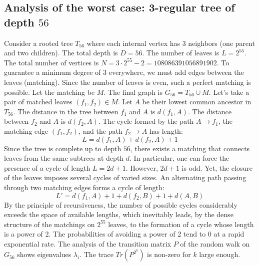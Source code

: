 \documentclass[12pt,a4paper]{article}
\begin{document}
\subsection{Analysis of the worst case: 3-regular tree of depth $56$}
Consider a rooted tree $T_{56}$ where each internal vertex has 3 neighbors (one parent and two children).
The total depth is $D = 56$.
The number of leaves is $L = 2^{55}$.
The total number of vertices is $N = 3 \cdot 2^{55} - 2 = 108086391056891902$.
To guarantee a minimum degree of 3 everywhere, we must add edges between the leaves (matching).
Since the number of leaves is even, such a perfect matching is possible.
Let the matching be $M$. The final graph is $G_{56} = T_{56} \cup M$.
Let's take a pair of matched leaves $(f_1, f_2) \in M$.
Let $A$ be their lowest common ancestor in $T_{56}$.
The distance in the tree between $f_1$ and $A$ is $d(f_1, A)$.
The distance between $f_2$ and $A$ is $d(f_2, A)$.
The cycle formed by the path $A \to f_1$, the matching edge $(f_1, f_2)$, and the path $f_2 \to A$ has length:
$$ L = d(f_1, A) + d(f_2, A) + 1 $$
Since the tree is complete up to depth $56$, there exists a matching that connects leaves from the same subtrees at depth $d$.
In particular, one can force the presence of a cycle of length $L = 2d + 1$. However, $2d+1$ is odd.
Yet, the closure of the leaves imposes several cycles of varied sizes. An alternating path passing through two matching edges forms a cycle of length:
$$ L' = d(f_1, A) + 1 + d(f_2, B) + 1 + d(A, B) $$
By the principle of recursiveness, the number of possible cycles considerably exceeds the space of available lengths, which inevitably leads, by the dense structure of the matchings on $2^{55}$ leaves, to the formation of a cycle whose length is a power of 2. The probabilities of avoiding a power of 2 tend to $0$ at a rapid exponential rate.
The analysis of the transition matrix $P$ of the random walk on $G_{56}$ shows eigenvalues $\lambda_i$. The trace $Tr(P^{2^k})$ is non-zero for $k$ large enough.
\end{document}
